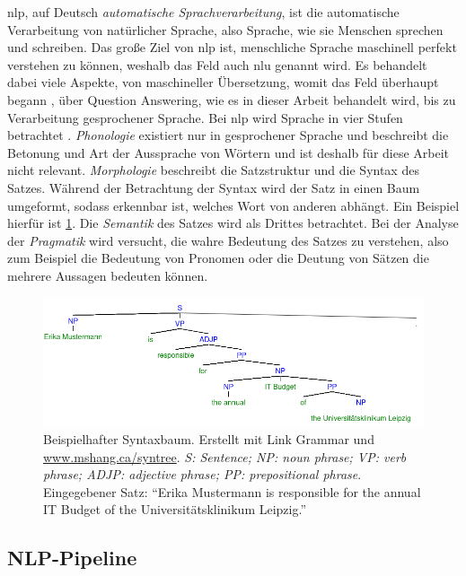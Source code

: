 \acf{nlp}, auf Deutsch \emph{automatische Sprachverarbeitung}, ist die automatische Verarbeitung von natürlicher Sprache, also Sprache, wie sie Menschen sprechen und schreiben.
Das große Ziel von \ac{nlp} ist, menschliche Sprache maschinell perfekt verstehen zu können, weshalb das Feld auch \ac{nlu} genannt wird.
Es behandelt dabei viele Aspekte, von maschineller Übersetzung, womit das Feld überhaupt begann \citep{nlphistory}, über Question Answering,
wie es in dieser Arbeit behandelt wird, bis zu Verarbeitung gesprochener Sprache.
Bei \ac{nlp} wird Sprache in vier Stufen betrachtet \citep{nlpreviewtts}.
\emph{Phonologie} existiert nur in gesprochener Sprache und beschreibt die Betonung und Art der Aussprache von Wörtern und ist deshalb für diese Arbeit nicht relevant.
\emph{Morphologie} beschreibt die Satzstruktur und die Syntax des Satzes.
Während der Betrachtung der Syntax wird der Satz in einen Baum umgeformt, sodass erkennbar ist, welches Wort von anderen abhängt.
Ein Beispiel hierfür ist \cref{fig:syntaxtree}.
Die \emph{Semantik} des Satzes wird als Drittes betrachtet.
Bei der Analyse der \emph{Pragmatik} wird versucht, die wahre Bedeutung des Satzes zu verstehen, also zum Beispiel die Bedeutung von Pronomen oder die Deutung von Sätzen die mehrere Aussagen bedeuten können.
\begin{figure}%
\centering
\includegraphics[width=\textwidth, height=\textheight, keepaspectratio]{Images/syntaxtree.png}
\caption[Beispielhafter Syntaxbaum]{Beispielhafter Syntaxbaum. Erstellt mit Link Grammar \citep{grammarparser} und \url{www.mshang.ca/syntree}.
\emph{S: Sentence; NP: noun phrase; VP: verb phrase; ADJP: adjective phrase; PP: prepositional phrase}.
Eingegebener Satz: \enquote{Erika Mustermann is responsible for the annual IT Budget of the Universitätsklinikum Leipzig.}}
\label{fig:syntaxtree}
\end{figure}

\subsection{NLP-Pipeline}

